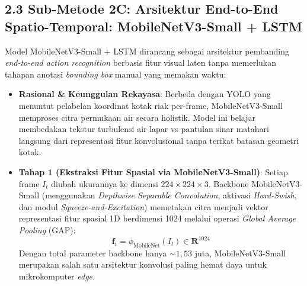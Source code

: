 \documentclass[10pt,a4paper]{article}
\providecommand{\text}[1]{\mbox{#1}}
\begin{document}
\newpage

\subsection*{2.3 Sub-Metode 2C: Arsitektur End-to-End Spatio-Temporal: MobileNetV3-Small + LSTM}
Model MobileNetV3-Small + LSTM dirancang sebagai arsitektur pembanding \textit{end-to-end action recognition} berbasis fitur visual laten tanpa memerlukan tahapan anotasi \textit{bounding box} manual yang memakan waktu:
\begin{itemize}
    \item \textbf{Rasional \& Keunggulan Rekayasa}:
    Berbeda dengan YOLO yang menuntut pelabelan koordinat kotak riak per-frame, MobileNetV3-Small memproses citra permukaan air secara holistik. Model ini belajar membedakan tekstur turbulensi air lapar vs pantulan sinar matahari langsung dari representasi fitur konvolusional tanpa terikat batasan geometri kotak.
    
    \item \textbf{Tahap 1 (Ekstraksi Fitur Spasial via MobileNetV3-Small)}:
    Setiap frame $I_t$ diubah ukurannya ke dimensi $224 \times 224 \times 3$. Backbone MobileNetV3-Small (menggunakan \textit{Depthwise Separable Convolution}, aktivasi \textit{Hard-Swish}, dan modul \textit{Squeeze-and-Excitation}) memetakan citra menjadi vektor representasi fitur spasial 1D berdimensi 1024 melalui operasi \textit{Global Average Pooling} (GAP):
    \begin{equation}
        \mathbf{f}_t = \phi_{\text{MobileNet}}(I_t) \in \mathbf{R}^{1024}
    \end{equation}
    Dengan total parameter backbone hanya $\sim 1{,}53$ juta, MobileNetV3-Small merupakan salah satu arsitektur konvolusi paling hemat daya untuk mikrokomputer \textit{edge}.


\end{itemize}
\end{document}
